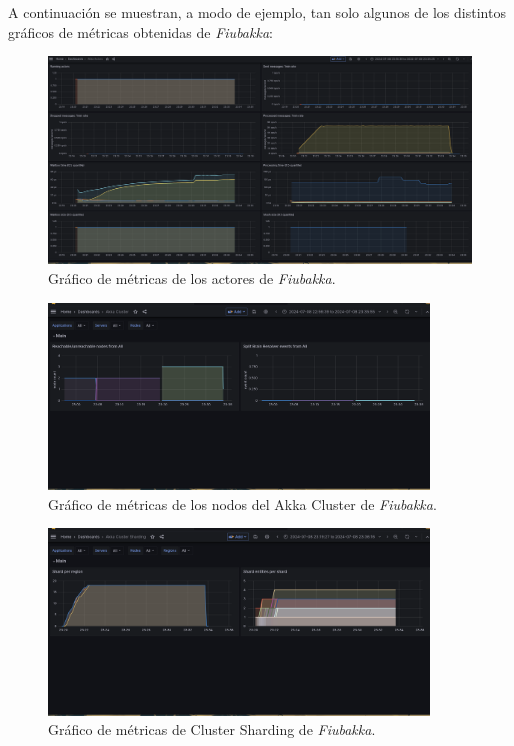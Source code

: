 A continuación se muestran, a modo de ejemplo, tan solo algunos de los distintos gráficos de métricas obtenidas de \textit{Fiubakka}:

\begin{figure}[htbp]
    \centering
    \includegraphics[width=1\textwidth]{../assets/actors-metrics.png}
    \caption{Gráfico de métricas de los actores de \textit{Fiubakka}.}
\end{figure}

\newpage

\begin{figure}[htbp]
    \centering
    \includegraphics[width=0.9\textwidth]{../assets/cluster-metrics.png}
    \caption{Gráfico de métricas de los nodos del Akka Cluster de \textit{Fiubakka}.}
\end{figure}

\begin{figure}[htbp]
    \centering
    \includegraphics[width=0.9\textwidth]{../assets/cluster-sharding-metrics.png}
    \caption{Gráfico de métricas de Cluster Sharding de \textit{Fiubakka}.}
\end{figure}

